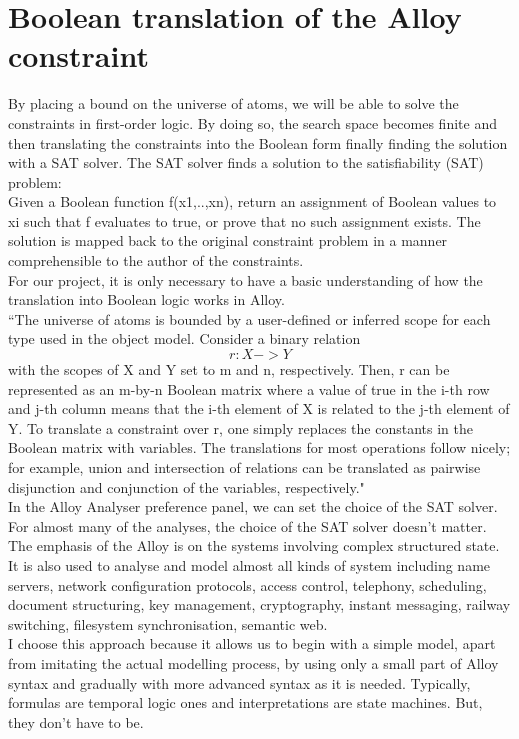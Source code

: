 \documentclass[a4paper,12pt]{extarticle}
\begin{document}
\section{Boolean translation of the Alloy constraint}
\label{Bool Transl}
By placing a bound on the universe of atoms, we will be able to solve the constraints in first-order logic. By doing so, the search space becomes finite and then translating the constraints into the Boolean form finally finding the solution with a SAT solver. The SAT solver finds a solution to the satisfiability (SAT) problem: \\
Given a Boolean function f(x1,..,xn), return an assignment of Boolean values to xi such that f evaluates to true, or prove that no such assignment exists. The solution is mapped back to the original constraint problem in a manner comprehensible to the author of the constraints. \\
 For our project, it is only necessary to have a basic understanding of how the translation into Boolean logic works in Alloy. \\
``The universe of atoms is bounded by a user-defined or inferred scope for each type used in the object model. Consider a binary relation 
\begin{equation}
r : X->Y
\end{equation} with the scopes of X and Y set to m and n, respectively. Then, r can be represented as an m-by-n Boolean matrix where a value of true in the i-th row and j-th column means that the i-th element of X is related to the j-th element of Y. To translate a constraint over r, one simply replaces the constants in the Boolean matrix with variables. The translations for most operations follow nicely; for example, union and intersection of relations can be translated as pairwise disjunction and conjunction of the variables, respectively." \\
In the Alloy Analyser preference panel, we can set the choice of the SAT solver. For almost many of the analyses, the choice of the SAT solver doesn't matter.
The emphasis of the Alloy is on the systems involving complex structured state. It is also used to analyse and model almost all kinds of system including name servers, network configuration protocols, access control, telephony, scheduling, document structuring, key management, cryptography, instant messaging, railway switching, filesystem synchronisation, semantic web. \\
I choose this approach because it allows us to begin with a simple model, apart from imitating the actual modelling process, by using only a small part of Alloy syntax and gradually with more advanced syntax as it is needed. Typically, formulas are temporal logic ones and interpretations are state machines. But, they don't have to be.
\end{document}
